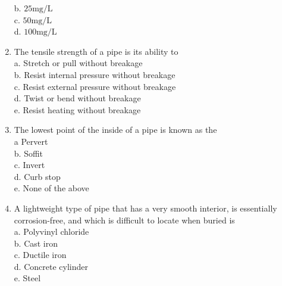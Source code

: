 \begin{enumerate}[1.]
b. $ 25 \mathrm{mg} / \mathrm{L}$\\
c. $50 \mathrm{mg} / \mathrm{L}$\\
d. $100 \mathrm{mg} / \mathrm{L}$\\
\item The tensile strength of a pipe is its ability to\\
a. Stretch or pull without breakage\\
b. Resist internal pressure without breakage\\
c. Resist external pressure without breakage\\
d. Twist or bend without breakage\\
e. Resist heating without breakage\\
\item The lowest point of the inside of a pipe is known as the\\
a Pervert\\
b. Soffit\\
c. Invert\\
d. Curb stop\\
e. None of the above\\
\item A lightweight type of pipe that has a very smooth interior, is essentially corrosion-free, and which is difficult to locate when buried is\\
a. Polyvinyl chloride\\
b. Cast iron\\
c. Ductile iron\\
d. Concrete cylinder\\
e. Steel\\


\end{enumerate}


